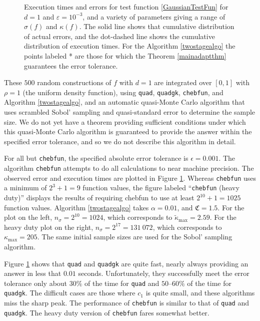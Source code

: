 \documentclass[graybox]{svmult}
\newcommand{\fudge}{\mathfrak{C}}
\newcommand{\tkappa}{\tilde{\kappa}}
\begin{document}
\begin{figure}
\caption{Execution times and errors for test function \eqref{GaussianTestFun} for $d=1$ and $\varepsilon=10^{-3}$, and a variety of parameters giving a range of $\sigma(f)$ and $\kappa(f)$. The solid line shows that cumulative distribution of actual errors, and the dot-dashed line shows the cumulative distribution of execution times.  For the Algorithm \ref{twostagealgo} the points labeled * are those for which the Theorem \ref{mainadaptthm} guarantees the error tolerance.\label{GaussianTestFunFig} }
\end{figure}

These $500$ random constructions of $f$ with $d=1$ are integrated over $[0,1]$ with $\rho=1$ (the uniform density function), using {\tt quad},  {\tt quadgk}, {\tt chebfun}, and Algorithm \ref{twostagealgo}, and an automatic quasi-Monte Carlo algorithm that uses scrambled Sobol' sampling \citep{Owe95,Owe96,Owe97,Mat98,HonHic00a,DicPil10a} and quasi-standard error \citep{Hal05a,Owe06a} to determine the sample size.  We do not yet have a theorem providing sufficient conditions under which this quasi-Monte Carlo algorithm is guaranteed to provide the answer within the specified error tolerance, and so we do not describe this algorithm in detail.  

For all but {\tt chebfun}, the specified absolute error tolerance is $\epsilon=0.001$.  The algorithm {\tt chebfun} attempts to do all calculations to near machine precision.  The observed error and execution times are plotted in Figure \ref{GaussianTestFunFig}.  Whereas {\tt chebfun} uses a minimum of $2^3+1=9$ function values, the figure labeled ``{\tt chebfun} (heavy duty)'' displays the results of requiring chebfun to use at least $2^{10}+1=1025$ function values.  Algorithm \ref{twostagealgo} takes $\alpha=0.01$, and $\fudge=1.5$.  For the plot on the left, $n_\sigma=2^{10}=1024$, which corresponds to  $\tkappa_{\max}=2.59$.  For the heavy duty plot on the right, $n_\sigma=2^{17}=131\ 072$, which corresponds to  $\kappa_{\max}=205$.  The same initial sample sizes are used for the Sobol' sampling algorithm.

Figure \ref{GaussianTestFunFig} shows that {\tt quad} and {\tt quadgk} are quite fast, nearly always providing an answer in less that $0.01$ seconds.  Unfortunately, they successfully meet the error tolerance only about $30\%$ of the time for {\tt quad} and $50$--$60\%$ of the time for {\tt quadgk}.  The difficult cases are those where $c_1$ is quite small, and these algorithms miss the sharp peak.  The performance of {\tt chebfun} is similar to that of {\tt quad} and {\tt quadgk}.  The heavy duty version of  {\tt chebfun} fares somewhat better.  
\end{document}
